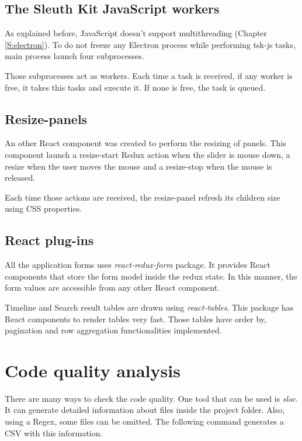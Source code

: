 \subsection{The Sleuth Kit JavaScript workers}

As explained before, JavaScript doesn't support multithreading (Chapter
\ref{S:electron}). To do not freeze any Electron process while performing
tsk-js tasks, main process launch four subprocesses.

Those subprocesses act as workers. Each time a task is received, if any worker
is free, it takes this tasks and execute it. If none is free, the task is 
queued.

\subsection{Resize-panels}

An other React component was created to perform the resizing of panels. This
component launch a resize-start Redux action when the slider is mouse down, a
resize when the user moves the mouse and a resize-stop when the mouse is 
released.

Each time those actions are received, the resize-panel refresh its children
size using CSS properties.

\subsection{React plug-ins}

All the application forms uses \textit{react-redux-form} package. It provides
React components that store the form model inside the redux state. In this
manner, the form values are accessible from any other React component.

Timeline and Search result tables are drawn using \textit{react-tables}. This 
package has React components to render tables very fast. Those tables have 
order by, pagination and row aggregation functionalities implemented.

\section{Code quality analysis}

There are many ways to check the code quality. One tool that can be used is 
\textit{sloc}. It can generate detailed information about files inside the 
project folder. Also, using a Regex, some files can be omitted. The following
command generates a CSV with this information.


